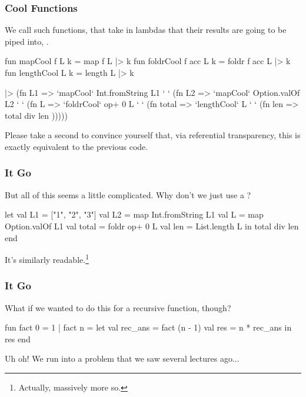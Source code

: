\documentclass[aspectratio=169, handout]{beamer}
\begin{document}
\begin{frame}[fragile]
  \frametitle{Cool Functions}

  We call such functions, that take in lambdas that their results are going
  to be piped into, .

  \begin{codeblock}
    fun mapCool f L k       = map f L |> k
    fun foldrCool f acc L k = foldr f acc L |> k
    fun lengthCool L k      = length L |> k
  \end{codeblock}

  \begin{codeblock}
    ["1", "2", "3"]           |> (fn L1 =>
    `mapCool` Int.fromString L1 `  ` (fn L2 =>
    `mapCool` Option.valOf L2   `  ` (fn L =>
    `foldrCool` op+ 0 L         `  ` (fn total =>
    `lengthCool` L              `  ` (fn len =>
    total div len                )))))
  \end{codeblock}

  Please take a second to convince yourself that, via referential transparency,
  this is exactly equivalent to the previous code.
\end{frame}



\begin{frame}[fragile]
  \frametitle{ It Go}

  But all of this seems a little complicated. Why don't we just use a ?

  \pause
  \begin{codeblock}
    let
      val L1    = ["1", "2", "3"]
      val L2    = map Int.fromString L1
      val L     = map Option.valOf L1
      val total = foldr op+ 0 L
      val len   = List.length L
    in
      total div len
    end
  \end{codeblock}

  \pause
  \vspace{\fill}

  It's similarly readable.\footnote{Actually, massively more so.}
\end{frame}

\begin{frame}[fragile]
  \frametitle{ It Go}

  What if we wanted to do this for a recursive function, though?

  \pause
  \vspace{\fill}

  \begin{codeblock}
    fun fact 0 = 1
      | fact n =
        let
          val rec_ans = fact (n - 1)
          val res = n * rec_ans
        in
          res
        end
  \end{codeblock}

  \pause
  \vspace{\fill}

  Uh oh! We run into a problem that we saw several lectures ago...
\end{frame}
\end{document}

